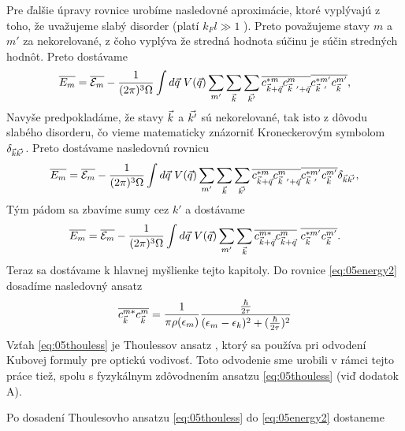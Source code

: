 Pre ďalšie úpravy rovnice urobíme nasledovné aproximácie, ktoré vyplývajú z toho, že uvažujeme slabý disorder (platí $k_F l \gg 1$ ). Preto považujeme stavy $m$  a $m'$ za nekorelované, z čoho vyplýva že stredná hodnota súčinu je súčin stredných hodnôt. Preto dostávame
\begin{align}
\overline{E_m}=\overline{\E_m} - \frac{1}{(2\pi)^3\Omega}\int d\vq\ V(\vq) \sum_{m'}\sum_{\vk}\sum_{\vkp}\overline{c^{*m}_{\vk+\vq}c^{m}_{\vk\ '+\vq}}\overline{c^{*m'}_{\vk\ '}c^{m'}_{\vk}}\text{,}
\end{align}
Navyše predpokladáme, že stavy $\vec{k}$ a $\vec{k'}$ sú nekorelované, tak isto z dôvodu slabého disorderu, čo vieme matematicky znázorniť Kroneckerovým symbolom $\delta_{\vec{k}\vec{k'}}$. Preto dostávame nasledovnú rovnicu
\begin{align}
\overline{E_m}=\overline{\E_m} - \frac{1}{(2\pi)^3\Omega}\int d\vq\ V(\vq) \sum_{m'}\sum_{\vk}\sum_{\vkp}\overline{c^{*m}_{\vk+\vq}c^{m}_{\vk\ '+\vq}}\overline{c^{*m'}_{\vk\ '}c^{m'}_{\vk}}\delta_{\vk\vkp}\text{,}
\end{align}
Tým pádom sa zbavíme sumy cez $k'$ a dostávame
\begin{align}
\label{eq:05energy2}
\overline{E_m}=\overline{\E_m} - \frac{1}{(2\pi)^3\Omega} \int d\vq\ V(\vq) \sum_{m'}\sum_{\vk} \overline{c^{m*}_{\vk+\vq}c^{m}_{\vk+\vq}}\ \overline{c^{*m'}_{\vk}c^{m'}_{\vk}} \text{.}
\end{align}
Teraz sa dostávame k hlavnej myšlienke tejto kapitoly. Do rovnice \eqref{eq:05energy2} dosadíme nasledovný ansatz
\begin{align}
\label{eq:05thouless}
\overline{c^{m*}_{\vec{k}}c^{m}_{\vec{k}}}=\frac{1}{\pi \rho(\epsilon_m)}\frac{\frac{\hbar}{2\tau}}{(\epsilon_m-\epsilon_{k})^2+(\frac{\hbar}{2\tau})^2}
\end{align}
Vzťah \eqref{eq:05thouless} je Thoulessov ansatz \cite{Thouless}, ktorý sa používa pri odvodení Kubovej formuly pre optickú vodivosť. Toto odvodenie sme urobili v rámci tejto práce tiež, spolu s fyzykálnym zdôvodnením ansatzu \eqref{eq:05thouless} (viď dodatok A).


Po dosadení Thoulesovho ansatzu \eqref{eq:05thouless} do \eqref{eq:05energy2} dostaneme  

